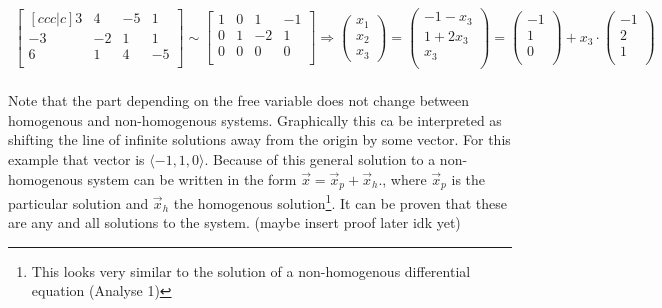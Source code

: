 \documentclass[11pt, a4paper]{article}
\begin{document}
\begin{align*}
  \begin{bmatrix}[ccc|c]
    3 & 4 & -5 & 1\\
    -3 & -2 & 1 & 1\\
    6 & 1 & 4 & -5\\
  \end{bmatrix}
  \sim
  \begin{bmatrix}
    1 & 0 & 1 & -1\\
    0 & 1 & -2 & 1\\
    0 & 0 & 0 & 0\\
  \end{bmatrix}
  \Rightarrow
  \begin{pmatrix} x_1 \\ x_2 \\ x_3 \end{pmatrix}
  = \begin{pmatrix} -1 - x_3\\ 1 + 2x_3\\ x_3\\ \end{pmatrix}
  = \begin{pmatrix} -1\\ 1\\ 0\\ \end{pmatrix} + x_3 \cdot \begin{pmatrix} -1\\ 2\\ 1\\ \end{pmatrix}
\end{align*}
\\
Note that the part depending on the free variable does not change between homogenous 
and non-homogenous systems. Graphically this ca be interpreted as shifting the line of 
infinite solutions away  from the origin by some vector. For this example that vector is 
$\langle -1, 1, 0 \rangle$. Because of this general solution to a non-homogenous system can
be written in the form  $\vec{x} = \vec{x}_p + \vec{x}_h$., where $\vec{x}_p$ is the particular
solution and $\vec{x}_h$ the homogenous solution\footnote{This looks very similar to the solution of a 
non-homogenous differential equation (Analyse 1)}. 
It can be proven that these are any and all solutions to the system. (maybe insert proof later idk yet)
\end{document}
